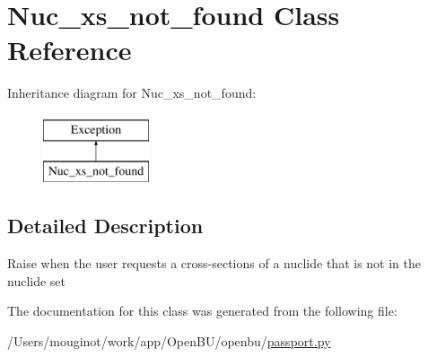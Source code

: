 \hypertarget{classopenbu_1_1passport_1_1_nuc__xs__not__found}{}\section{Nuc\+\_\+xs\+\_\+not\+\_\+found Class Reference}
\label{classopenbu_1_1passport_1_1_nuc__xs__not__found}
Inheritance diagram for Nuc\+\_\+xs\+\_\+not\+\_\+found\+:\begin{figure}[H]
\begin{center}
\leavevmode
\includegraphics[height=2.000000cm]{classopenbu_1_1passport_1_1_nuc__xs__not__found}
\end{center}
\end{figure}


\subsection{Detailed Description}
\begin{DoxyVerb}Raise when the user requests a cross-sections of a nuclide that is not in the nuclide set \end{DoxyVerb}
 

The documentation for this class was generated from the following file\+:\begin{DoxyCompactItemize}
\item 
/\+Users/mouginot/work/app/\+Open\+B\+U/openbu/\mbox{\hyperlink{passport_8py}{passport.\+py}}\end{DoxyCompactItemize}
